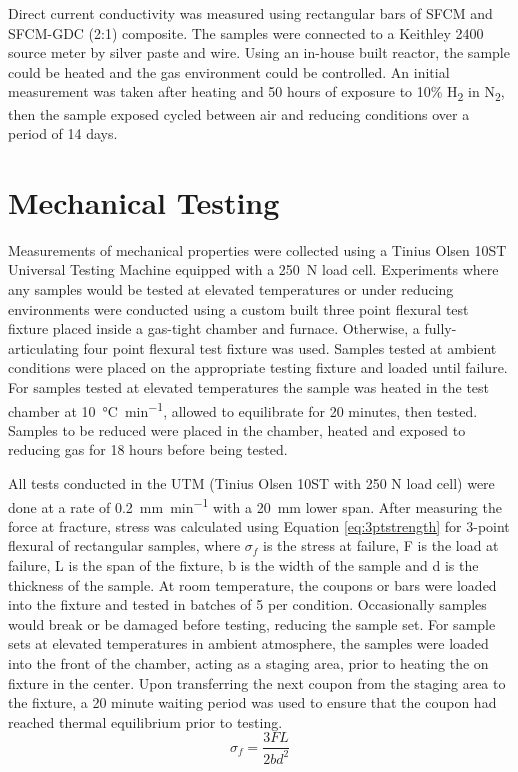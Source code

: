     Direct current conductivity was measured using rectangular bars of SFCM and SFCM-GDC (2:1) composite.
    The samples were connected to a Keithley 2400 source meter by silver paste and wire.
    Using an in-house built reactor, the sample could be heated and the gas environment could be controlled.
    An initial measurement was taken after heating and 50 hours of exposure to 10\% H\textsubscript{2} in N\textsubscript{2}, then the sample exposed cycled between air and reducing conditions over a period of 14 days.

\section{Mechanical Testing}
    Measurements of mechanical properties were collected using a Tinius Olsen 10ST Universal Testing Machine equipped with a \SI{250}{N} load cell.
    Experiments where any samples would be tested at elevated temperatures or under reducing environments were conducted using a custom built three point flexural test fixture placed inside a gas-tight chamber and furnace.
    Otherwise, a fully-articulating four point flexural test fixture was used.
    Samples tested at ambient conditions were placed on the appropriate testing fixture and loaded until failure.
    For samples tested at elevated temperatures the sample was heated in the test chamber at \SI{10}{\celsius\per\minute}, allowed to equilibrate for 20 minutes, then tested.
    Samples to be reduced were placed in the chamber, heated and exposed to reducing gas for 18 hours before being tested.

    All tests conducted in the UTM (Tinius Olsen 10ST with 250 N load cell)
    were done at a rate of \SI{0.2}{\milli\meter\per\minute} with a \SI{20}{\milli\meter} lower span.
    After measuring the force at fracture, stress was calculated using Equation \ref{eq:3ptstrength}
    for 3-point flexural of rectangular samples, where \(\sigma_{f}\) is the stress at failure, F is the load at failure, L is the span of the fixture, b is the width of the sample and d is the thickness of the sample.
    At room temperature, the coupons or bars were loaded into the fixture and tested in batches of 5 per condition.
    Occasionally samples would break or be damaged before testing, reducing the sample set.
    For sample sets at elevated temperatures in ambient atmosphere, the samples were loaded into the front of the chamber, acting as a staging area,
    prior to heating the on fixture in the center.
    Upon transferring the next coupon from the staging area to the fixture, a 20 minute waiting period was used to ensure that the coupon had reached thermal equilibrium prior to testing.
    \begin{equation}
        \sigma_{f} = \frac{3FL}{2bd^{2}}
        \label{eq:3ptstrength}
    \end{equation}

